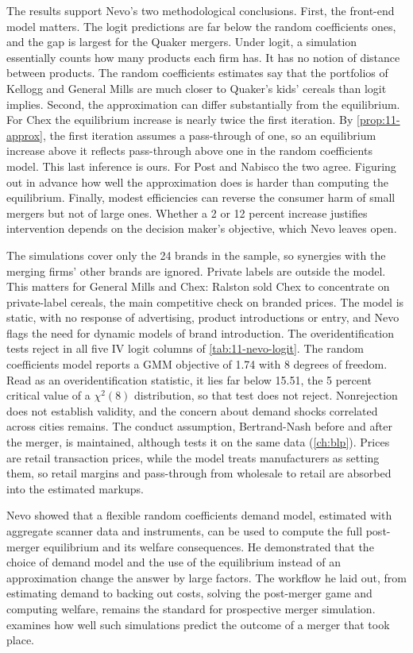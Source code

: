  The results support Nevo's two methodological conclusions. First, the front-end model
matters. The logit predictions are far below the random coefficients ones, and the gap is largest for the Quaker mergers. Under
logit, a simulation essentially counts how many products each firm has. It has no notion of distance between products.
The random coefficients estimates say that the portfolios of Kellogg and General Mills are much closer to Quaker's
kids' cereals than logit implies. Second, the approximation can differ substantially from the equilibrium. For Chex the
equilibrium increase is nearly twice the first iteration. By \cref{prop:11-approx}, the first iteration assumes a
pass-through of one, so an equilibrium increase above it reflects pass-through above one in the random coefficients
model. This last inference is ours. For Post and Nabisco the two agree. Figuring out in advance how well the
approximation does is harder than computing the equilibrium. Finally, modest efficiencies can reverse the consumer
harm of small mergers but not of large ones. Whether a 2 or 12 percent increase justifies intervention depends on the
decision maker's objective, which Nevo leaves open.

 The simulations cover only the 24 brands in the sample, so synergies with the
merging firms' other brands are ignored. Private labels are outside the model. This matters for General Mills and Chex:
Ralston sold Chex to concentrate on private-label cereals, the main competitive check on branded prices. The model is
static, with no response of advertising, product introductions or entry, and Nevo flags the need for dynamic models of
brand introduction. The overidentification tests reject in all five IV logit columns of \cref{tab:11-nevo-logit}.
The random coefficients model reports a GMM objective of 1.74 with 8 degrees of freedom. Read as an
overidentification statistic, it lies far below 15.51, the 5 percent critical value of a $\chi^2(8)$ distribution,
so that test does not reject. Nonrejection does not establish validity, and the concern about demand shocks
correlated across cities remains. The conduct assumption, Bertrand-Nash before and
after the merger, is maintained, although \citet{Nevo2001} tests it on the same data (\cref{ch:blp}). Prices are retail
transaction prices, while the model treats manufacturers as setting them, so retail margins and pass-through from
wholesale to retail are absorbed into the estimated markups.

 Nevo showed that a flexible random coefficients demand model, estimated with aggregate scanner
data and instruments, can be used to compute the full post-merger equilibrium and its welfare consequences. He
demonstrated that the choice of demand model and the use of the equilibrium instead of an approximation change the
answer by large factors. The workflow he laid out, from estimating demand to backing out costs, solving the post-merger
game and computing welfare, remains the standard for prospective merger simulation.  examines how well
such simulations predict the outcome of a merger that took place.
